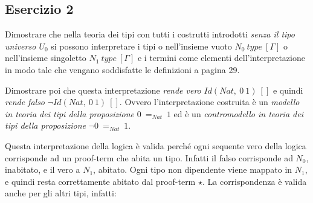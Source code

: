 \subsection{Esercizio 2}
\begin{thm}
	Dimostrare che nella teoria dei tipi con tutti i costrutti introdotti \textit{senza il tipo universo $U_0$} si possono interpretare i tipi o nell'insieme vuoto $N_0~type~[\Gamma]$ o nell'insieme singoletto $N_1~type~[\Gamma]$ e i termini come elementi dell'interpretazione in modo tale che vengano soddisfatte le definizioni a pagina 29.
	
	Dimostrare poi che questa interpretazione \textit{rende vero} $Id(Nat,~0~1)~[]$ e quindi \textit{rende falso} $\neg Id(Nat,~0~1)~[]$. Ovvero l'interpretazione costruita è un \textit{modello in teoria dei tipi della proposizione} $0~=_{Nat}~1$ ed è un \textit{contromodello in teoria dei tipi della proposizione} $\neg 0~=_{Nat}~1$.
\end{thm}
Questa interpretazione della logica è valida perché ogni sequente vero della logica corrisponde ad un proof-term che abita un tipo. Infatti il falso corrisponde ad $N_0$, inabitato, e il vero a $N_1$, abitato. Ogni tipo non dipendente viene mappato in $N_1$, e quindi resta correttamente abitato dal proof-term $\star$. La corrispondenza è valida anche per gli altri tipi, infatti:
